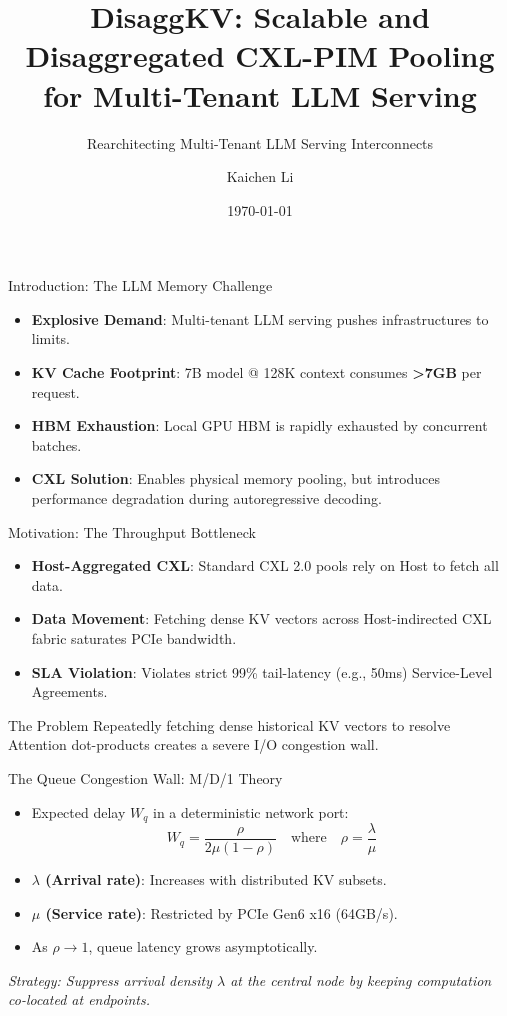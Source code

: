\documentclass{beamer}
\title{DisaggKV: Scalable and Disaggregated CXL-PIM Pooling for Multi-Tenant LLM Serving}
\subtitle{Rearchitecting Multi-Tenant LLM Serving Interconnects}
\author{Kaichen Li}
\institute{Department of Computer and Information Engineering \\ Youngsan University, South Korea}
\date{\today}
\begin{document}
\begin{frame}
    \titlepage
\end{frame}

\begin{frame}{Introduction: The LLM Memory Challenge}
    \begin{itemize}
        \item \textbf{Explosive Demand}: Multi-tenant LLM serving pushes infrastructures to limits.
        \item \textbf{KV Cache Footprint}: 7B model @ 128K context consumes \textbf{>7GB} per request.
        \item \textbf{HBM Exhaustion}: Local GPU HBM is rapidly exhausted by concurrent batches.
        \item \textbf{CXL Solution}: Enables physical memory pooling, but introduces performance degradation during autoregressive decoding.
    \end{itemize}
\end{frame}

\begin{frame}{Motivation: The Throughput Bottleneck}
    \begin{itemize}
        \item \textbf{Host-Aggregated CXL}: Standard CXL 2.0 pools rely on Host to fetch all data.
        \item \textbf{Data Movement}: Fetching dense KV vectors across Host-indirected CXL fabric saturates PCIe bandwidth.
        \item \textbf{SLA Violation}: Violates strict 99\% tail-latency (e.g., 50ms) Service-Level Agreements.
    \end{itemize}
    \vspace{0.5cm}
    \begin{block}{The Problem}
        Repeatedly fetching dense historical KV vectors to resolve Attention dot-products creates a severe I/O congestion wall.
    \end{block}
\end{frame}

\begin{frame}{The Queue Congestion Wall: M/D/1 Theory}
    \begin{itemize}
        \item Expected delay $W_q$ in a deterministic network port:
        \[ W_q = \frac{\rho}{2\mu(1 - \rho)} \quad \text{where} \quad \rho = \frac{\lambda}{\mu} \]
        \item \textbf{$\lambda$ (Arrival rate)}: Increases with distributed KV subsets.
        \item \textbf{$\mu$ (Service rate)}: Restricted by PCIe Gen6 x16 (64GB/s).
        \item As $\rho \to 1$, queue latency grows asymptotically.
    \end{itemize}
    \vspace{0.2cm}
    \centering
    \textit{Strategy: Suppress arrival density $\lambda$ at the central node by keeping computation co-located at endpoints.}
\end{frame}
\end{document}
